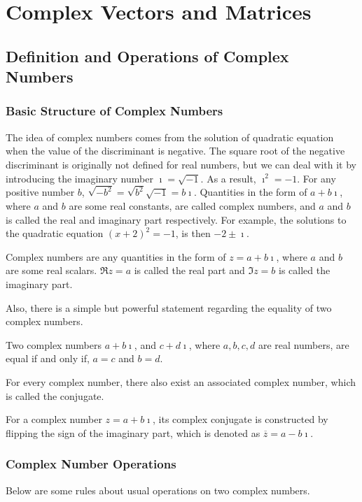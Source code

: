 \chapter{Complex Vectors and Matrices}

\section{Definition and Operations of Complex Numbers}
\label{section:complexno}

\subsection{Basic Structure of Complex Numbers} The idea of complex numbers comes from the solution of quadratic equation when the value of the discriminant is negative. The square root of the negative discriminant is originally not defined for real numbers, but we can deal with it by introducing the imaginary number $\imath = \sqrt{-1}$. As a result, $\imath^2 = -1$. For any positive number $b$, $\sqrt{-b^2} = \sqrt{b^2}\sqrt{-1} = b\imath$. Quantities in the form of $a + b\imath$, where $a$ and $b$ are some real constants, are called complex numbers, and $a$ and $b$ is called the real and imaginary part respectively. For example, the solutions to the quadratic equation $(x+2)^2 = -1$, is then $-2 \pm \imath$.
\begin{defn}
Complex numbers are any quantities in the form of $z = a + b\imath$, where $a$ and $b$ are some real scalars. $\Re{z} = a$ is called the real part and $\Im{z} = b$ is called the imaginary part.
\end{defn}
Also, there is a simple but powerful statement regarding the equality of two complex numbers.
\begin{proper}
Two complex numbers $a + b\imath$, and $c + d\imath$, where $a, b, c, d$ are real numbers, are equal if and only if, $a = c$ and $b = d$.
\end{proper}
For every complex number, there also exist an associated complex number, which is called the conjugate.
\begin{defn}
For a complex number $z = a + b\imath$, its complex conjugate is constructed by flipping the sign of the imaginary part, which is denoted as $\overline{z} = a - b\imath$.
\end{defn}

\subsection{Complex Number Operations}
Below are some rules about usual operations on two complex numbers.

